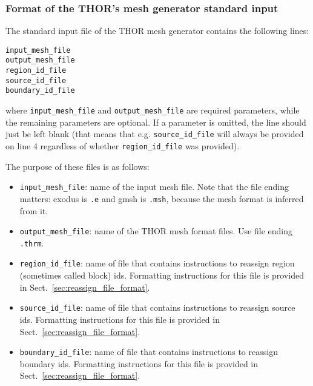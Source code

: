 \subsubsection{Format of the THOR's mesh generator standard input}
The standard input file of the THOR mesh generator contains the following lines:
\begin{verbatim}
input_mesh_file
output_mesh_file
region_id_file
source_id_file
boundary_id_file
\end{verbatim}
where \verb"input_mesh_file" and \verb"output_mesh_file" are required parameters, while the remaining parameters are optional.
If a parameter is omitted, the line should just be left blank (that means that e.g. \verb"source_id_file" will always be provided
on line 4 regardless of whether \verb"region_id_file" was provided).

The purpose of these files is as follows:
\begin{itemize}
    \item \verb"input_mesh_file": name of the input mesh file. Note that the file ending matters: exodus is \verb".e" and gmsh is \verb".msh", because the mesh format is inferred from it.
    \item \verb"output_mesh_file": name of the THOR mesh format files. Use file ending \verb".thrm".
    \item  \verb"region_id_file": name of file that contains instructions to reassign region (sometimes called block) ids. Formatting instructions for this file is provided in Sect.~\ref{sec:reassign_file_format}.
    \item  \verb"source_id_file": name of file that contains instructions to reassign source ids. Formatting instructions for this file is provided in Sect.~\ref{sec:reassign_file_format}.
    \item  \verb"boundary_id_file": name of file that contains instructions to reassign boundary ids. Formatting instructions for this file is provided in Sect.~\ref{sec:reassign_file_format}.
\end{itemize}

